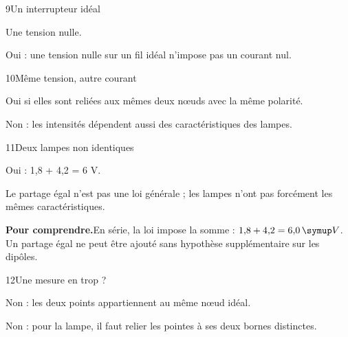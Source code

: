 \par\noindent\begin{minipage}{\linewidth}
\begin{corrige}{9}{Un interrupteur idéal}
\begin{questions}
\item Une tension nulle.
\item Oui : une tension nulle sur un fil idéal n’impose pas un courant nul.
\end{questions}
\end{corrige}
\end{minipage}
\par\noindent\begin{minipage}{\linewidth}
\begin{corrige}{10}{Même tension, autre courant}
\begin{questions}
\item Oui si elles sont reliées aux mêmes deux nœuds avec la même polarité.
\item Non : les intensités dépendent aussi des caractéristiques des lampes.
\end{questions}
\end{corrige}
\end{minipage}
\par\noindent\begin{minipage}{\linewidth}
\begin{corrige}{11}{Deux lampes non identiques}
\begin{questions}
\item Oui : 1,8 + 4,2 = 6 V.
\item Le partage égal n’est pas une loi générale ; les lampes n’ont pas forcément les mêmes caractéristiques.
\end{questions}
\par\smallskip\noindent\textbf{Pour comprendre.}\enspace En série, la loi impose la somme : $1{,}8+4{,}2=6{,}0\unite V$. Un partage égal ne peut être ajouté sans hypothèse supplémentaire sur les dipôles.\par
{}
\end{corrige}
\end{minipage}
\par\noindent\begin{minipage}{\linewidth}
\begin{corrige}{12}{Une mesure en trop ?}
\begin{questions}
\item Non : les deux points appartiennent au même nœud idéal.
\item Non : pour la lampe, il faut relier les pointes à ses deux bornes distinctes.
\end{questions}
\end{corrige}
\end{minipage}
